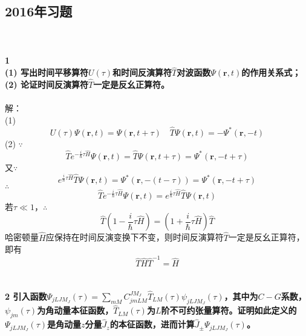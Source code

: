 \documentclass[12pt]{article}
\numberwithin{equation}{section}	 %
\begin{document}
\begin{spacing}{1.5}
\subsection{2016年习题}
~\\
~\\
\textbf{1 \quad \\
(1) 写出时间平移算符$U(\tau)$和时间反演算符$\hat{T}$对波函数$\Psi(\bm{r},t)$的作用关系式；\\
(2) 论证时间反演算符$\hat{T}$一定是反幺正算符。}\\
~\\
解：\\
(1) 
\begin{equation}
U(\tau)\Psi(\bm{r},t) = \Psi(\bm{r},t+\tau) \quad \hat{T}\Psi(\bm{r},t) = -\Psi^{*}(\bm{r},-t)
\end{equation}
(2) 
$\because$
\begin{equation}\nonumber 		%
\hat{T}e^{-\frac{i}{\hbar}\tau\hat{H}}\Psi(\bm{r},t) = \hat{T}\Psi(\bm{r},t+\tau) = \Psi^{*}(\bm{r},-t+\tau)
\end{equation}
又$\because$
\begin{equation}\nonumber 		%
e^{\frac{i}{\hbar}\tau\hat{H}}\hat{T}\Psi(\bm{r},t) = \Psi^{*}(\bm{r},-(t-\tau)) = \Psi^{*}(\bm{r},-t+\tau)
\end{equation}
$\therefore$
\begin{equation}
\hat{T}e^{-\frac{i}{\hbar}\tau\hat{H}}\Psi(\bm{r},t) = e^{\frac{i}{\hbar}\tau\hat{H}}\hat{T}\Psi(\bm{r},t)
\end{equation}
若$\tau \ll 1$，$\therefore$
\begin{equation}
\hat{T}\left(1-\frac{i}{\hbar}\tau\hat{H}\right) = \left(1+\frac{i}{\hbar}\tau\hat{H}\right)\hat{T}
\end{equation}
哈密顿量$\hat{H}$应保持在时间反演变换下不变，则时间反演算符$\hat{T}$一定是反幺正算符，即有
\begin{equation}
\hat{T}\hat{H}\hat{T}^{-1} = \hat{H}
\end{equation}
~\\
~\\
\textbf{2 \quad 引入函数$\displaystyle \Psi_{jLJM_{J}}(\tau) = \sum_{mM} C_{jmLM}^{JM_{J}}\hat{T}_{LM}(\tau)\psi_{jLJM_{J}}(\tau)$，其中为$C-G$系数，$\displaystyle \psi_{jm}(\tau)$为角动量本征函数，$\hat{T}_{LM}(\tau)$为$L$阶不可约张量算符。证明如此定义的$\displaystyle \Psi_{jLJM_{J}}(\tau)$是角动量$z$分量$\hat{J}_{z}$的本征函数，进而计算$\displaystyle \hat{J}_{\pm}\Psi_{jLJM_{J}}(\tau)$。}\\

\end{spacing}
\end{document}
